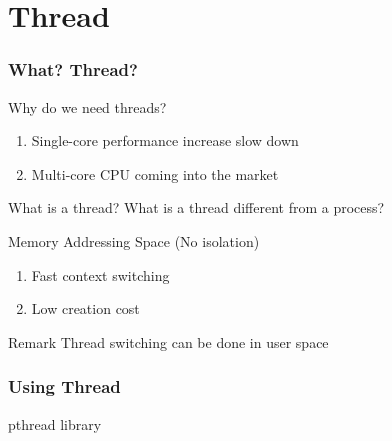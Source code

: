 \section{Thread}

\begin{frame}
    \frametitle{What? Thread?}
    Why do we need threads?
    \begin{enumerate}
        \item Single-core performance increase slow down
        \item Multi-core CPU coming into the market
    \end{enumerate}

    What is a thread? What is a thread different from a process?

    Memory Addressing Space (No isolation)
    \begin{enumerate}
        \item Fast context switching
        \item Low creation cost
    \end{enumerate}

    \vspace{2em}

    \begin{alertblock}{Remark}
        Thread switching can be done in user space
    \end{alertblock}
\end{frame}


\begin{frame}
    \frametitle{Using Thread}
    pthread library
\end{frame}

